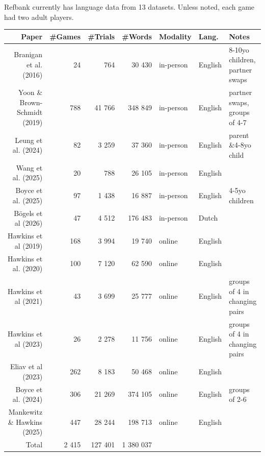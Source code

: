 \documentclass[11pt,a4paper]{article}
\begin{document}
\begin{small}
\begin{minipage}{\textwidth}
	Refbank currently has language data from 13 datasets. Unless noted, each game had two adult players.
	
	\begin{footnotesize}
	\centering
	\setlength{\tabcolsep}{3pt} 
	\begin{tabular}{rrrrlll}

		 Paper & \#Games & \#Trials & \#Words & Modality & Lang. & Notes \\ 
		\hline
				 Branigan et al. (2016)  &  24  & 764 & 30 430 & in-person & English & 8-10yo children, partner swaps \\ 
				 		 		Yoon \& Brown-Schmidt (2019) & 788 & 41 766 & 348 849 & in-person & English &partner swaps, groups of 4-7 \\ 
				 		 				 Leung et al. (2024) &  82  & 3 259 & 37 360 & in-person& English &parent \&4-8yo child \\ 
		Wang et al. (2025) & 20 & 788 & 26 105 & in-person & English &\\
		  Boyce et al. (2025)  &  97  & 1 438 & 16 887 & in-person &  English & 4-5yo children\\ 
		 		Bögels et al (2026) &  47 & 4 512 & 176 483 & in-person & Dutch & \\ 
		 
		

		 Hawkins et al (2019)  & 168  & 3 994 & 19 740 & online &English & \\ 
		 Hawkins et al. (2020) & 100  & 7 120 & 62 590 & online &English & \\ 
		 		 Hawkins et al (2021)  &  43  & 3 699 & 25 777 & online& English &  groups of 4 in changing pairs\\ 
		 		 		 Hawkins et al (2023) &  26  & 2 278 & 11 756 & online & English & groups of 4 in changing pairs\\ 
		 		 		 		 Eliav et al (2023)  & 262  & 8 183 & 50 468 & online& English & \\ 
		 		 		 		  Boyce et al. (2024) & 306  & 21 269 & 374 105 & online & English & groups of 2-6 \\ 
		 		 Mankewitz \& Hawkins (2025)  & 447 & 28 244 & 198 713 & online&English &  \\ 


		 


		\hline
		Total & 2 415 & 127 401 & 1 380 037	 &&& \\
		\hline
	\end{tabular}
\end{footnotesize}
	\end{minipage}




\end{small}
\end{document}
